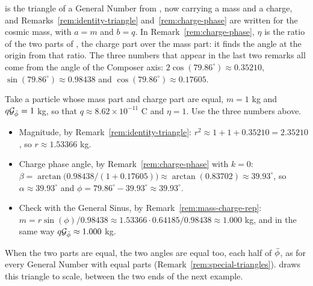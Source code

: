 \begin{plainwords}
 is the triangle of a General Number from , now carrying a mass and a charge, and Remarks~\ref{rem:identity-triangle} and~\ref{rem:charge-phase} are  written for the cosmic mass, with $a = m$ and $b = q$. In Remark~\ref{rem:charge-phase}, $\eta$ is the ratio of the two parts of , the charge part over the mass part: it finds the angle at the origin from that ratio. The three numbers that appear in the last two remarks all come from the angle of the Composer axis: $2\cos(79.86^\circ) \approx 0.35210$, $\sin(79.86^\circ) \approx 0.98438$ and $\cos(79.86^\circ) \approx 0.17605$.
\end{plainwords}

\begin{workedexample}
Take a particle whose mass part and charge part are equal, $m = 1$ kg and $q\mathcal{G}_{\bar{\phi}} = 1$ kg, so that $q \approx 8.62 \times 10^{-11}$ C and $\eta = 1$. Use the three numbers above.
\begin{itemize}
  \item Magnitude, by Remark~\ref{rem:identity-triangle}: $r^2 \approx 1 + 1 + 0.35210 = 2.35210$, so $r \approx 1.53366$ kg.
  \item Charge phase angle, by Remark~\ref{rem:charge-phase} with $k = 0$: $\beta = \arctan\bigl(0.98438/(1 + 0.17605)\bigr) \approx \arctan(0.83702) \approx 39.93^\circ$, so $\alpha \approx 39.93^\circ$ and $\phi = 79.86^\circ - 39.93^\circ \approx 39.93^\circ$.
  \item Check with the General Sinus, by Remark~\ref{rem:mass-charge-rep}: $m = r\sin(\phi)/0.98438 \approx 1.53366 \cdot 0.64185/0.98438 \approx 1.000$ kg, and in the same way $q\mathcal{G}_{\bar{\phi}} \approx 1.000$ kg.
\end{itemize}
When the two parts are equal, the two angles are equal too, each half of $\bar{\phi}$, as for every General Number with equal parts (Remark~\ref{rem:special-triangles}).  draws this triangle to scale, between the two ends of the next example.
\end{workedexample}

